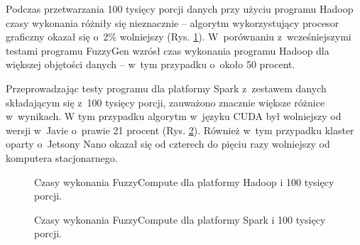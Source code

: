 Podczas przetwarzania 100 tysięcy porcji danych przy użyciu programu Hadoop czasy wykonania różniły się
nieznacznie -- algorytm wykorzystujący procesor graficzny okazał się o~2\% wolniejszy
(Rys. \ref{fig:fuzzycompute:hadoop:100K}). W~porównaniu z~wcześniejszymi testami programu FuzzyGen
wzrósł czas wykonania programu Hadoop dla większej objętości danych -- w~tym przypadku o~około 50 procent.

Przeprowadzając testy programu dla platformy Spark z~zestawem danych składającym się z~100 tysięcy
porcji, zauważono znacznie większe różnice w~wynikach. W tym przypadku algorytm w~języku CUDA był
wolniejszy od wersji w~Javie o~prawie 21 procent (Rys. \ref{fig:fuzzycompute:spark:100K}). Również
w~tym przypadku klaster oparty o~Jetsony Nano okazał się od czterech do pięciu razy wolniejszy od
komputera stacjonarnego.

\begin{figure}[h]
    \centering
    \caption{Czasy wykonania FuzzyCompute dla platformy Hadoop i 100 tysięcy porcji.}
    \label{fig:fuzzycompute:hadoop:100K}
\end{figure}

\begin{figure}[h!]
    \centering
    \caption{Czasy wykonania FuzzyCompute dla platformy Spark i 100 tysięcy porcji.}
    \label{fig:fuzzycompute:spark:100K}
\end{figure}
\newpage

